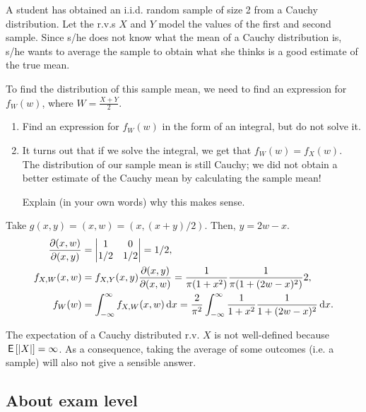 \documentclass[assignments]{subfiles}
\begin{document}
\begin{exercise}
A student has obtained an i.i.d.
random sample of size 2 from a Cauchy distribution. Let the r.v.s $X$ and $Y$ model the  values of the first and second sample.
Since s/he does not know what the mean of a Cauchy distribution is, s/he wants to average the sample to obtain what she thinks is a good estimate of the true mean.

To find the distribution of this sample mean, we need to find an expression for $f_W(w)$, where $W=\frac{X+Y}2$.

\begin{enumerate}
\item Find an expression for $f_W(w)$ in the form of an integral, but do not solve it.
\item It turns out that if we solve the integral, we get that $f_W(w) = f_X(w)$. The distribution of our sample mean is still Cauchy; we did not obtain a better estimate of the Cauchy mean by calculating the sample mean!

Explain (in your own words) why this makes sense.
\end{enumerate}
\begin{solution}
 Take $g(x,y) = (x, w) = (x, (x+y)/2)$. Then, $y=2w -x$.
\begin{align}
\frac{\partial (x,w)}{\partial (x, y)} &=
  \begin{vmatrix}
    1 & 0 \\
1/2 & 1/2
  \end{vmatrix} = 1/2,\\
f_{X,W}(x,w) &= f_{X,Y}(x,y) \frac{\partial(x,y)}{\partial(x,w)} = \frac{1}{\pi(1+x^{2})}\frac{1}{\pi(1+(2w-x)^{2})} 2,\\
f_{W}(w) &= \int_{-\infty}^{\infty} f_{X,W}(x,w) \,\textrm{d}x = \frac{2}{\pi^{2}} \int_{-\infty}^{\infty} \frac{1}{1+x^{2}}\frac{1}{1+(2w-x)^{2}} \,\textrm{d}x.
\end{align}

The expectation of a Cauchy distributed r.v. $X$ is not well-defined because $\,\mathsf{E}\left[|X|\right] = \infty$. As a consequence, taking the average of some outcomes (i.e. a sample) will also not give a sensible answer.
\end{solution}
\end{exercise}






\subsection{About exam level}
\end{document}
